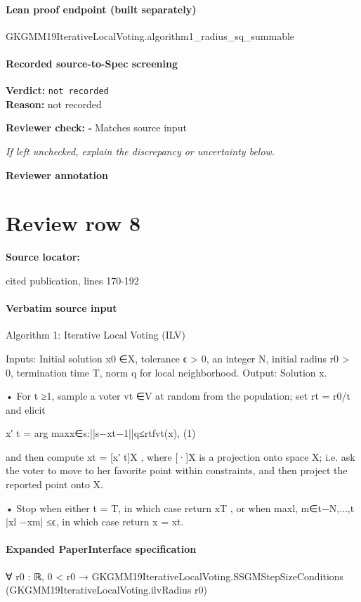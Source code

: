\documentclass[10pt]{article}
\newcommand{\reviewerbox}{%
  \par\noindent\fbox{\parbox{0.96\linewidth}{\rule{0pt}{0.38in}}}\par
}
\newcommand{\reviewmatch}[1]{%
  \par\noindent\textbf{Reviewer check:} $\square$\; #1\par
  \noindent\emph{If left unchecked, explain the discrepancy or uncertainty below.}\par
}
\begin{document}
\paragraph{Lean proof endpoint (built separately)}\begin{ReviewVerbatim}
GKGMM19IterativeLocalVoting.algorithm1_radius_sq_summable
\end{ReviewVerbatim}

\paragraph{Recorded source-to-Spec screening}
\textbf{Verdict:} \texttt{not recorded}
\\
\textbf{Reason:} not recorded
\reviewmatch{Matches source input}
\noindent\textbf{Reviewer annotation}\par
\reviewerbox
\clearpage
\hypertarget{source-claim-0b205aab018f3bcb}{}
\section*{Review row 8}
\textbf{Source locator:} {\footnotesize\raggedright cited publication, lines 170-\allowbreak{}192\par}
\paragraph{Verbatim source input}
\begin{ReviewVerbatim}
Algorithm 1: Iterative Local Voting (ILV)

Inputs:
Initial solution x0 ∈X, tolerance ϵ > 0, an integer N, initial radius r0 > 0,
termination time T, norm q for local neighborhood.
Output:
Solution x.

• For t ≥1, sample a voter vt ∈V at random from the population; set rt = r0/t
and elicit

x′
t = arg maxx∈{s:||s−xt−1||q≤rt}fvt(x),
(1)

and then compute xt = [x′
t]X , where [·]X is a projection onto space X; i.e. ask
the voter to move to her favorite point within constraints, and then project the
reported point onto X.

• Stop when either t = T, in which case return xT , or when
maxl, m∈{t−N,...,t} |xl −xm| ≤ϵ, in which case return x = xt.
\end{ReviewVerbatim}


\paragraph{Expanded PaperInterface specification}
\begin{ReviewVerbatim}
∀ {r0 : ℝ}, 0 < r0 → GKGMM19IterativeLocalVoting.SSGMStepSizeConditions (GKGMM19IterativeLocalVoting.ilvRadius r0)
\end{ReviewVerbatim}
\end{document}
